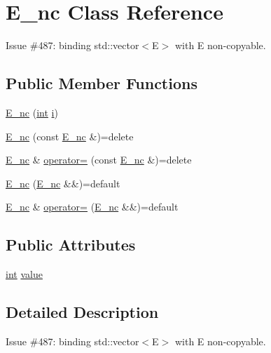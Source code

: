 \hypertarget{class_e__nc}{}\section{E\+\_\+nc Class Reference}
\label{class_e__nc}


Issue \#487\+: binding std\+::vector$<$\+E$>$ with E non-\/copyable.  


\subsection*{Public Member Functions}
\begin{DoxyCompactItemize}
\item 
\mbox{\hyperlink{class_e__nc_adacd8dd96177d755c54db09108e381ff}{E\+\_\+nc}} (\mbox{\hyperlink{warnings_8h_a74f207b5aa4ba51c3a2ad59b219a423b}{int}} \mbox{\hyperlink{abstract_8h_a13235ab5ddf5c2ccd5ca35ab01d91328}{i}})
\item 
\mbox{\hyperlink{class_e__nc_a42e51ed614a7af4fd2d0f6d71a077fab}{E\+\_\+nc}} (const \mbox{\hyperlink{class_e__nc}{E\+\_\+nc}} \&)=delete
\item 
\mbox{\hyperlink{class_e__nc}{E\+\_\+nc}} \& \mbox{\hyperlink{class_e__nc_aa03284dc9f6a270b67d05cbdf685326d}{operator=}} (const \mbox{\hyperlink{class_e__nc}{E\+\_\+nc}} \&)=delete
\item 
\mbox{\hyperlink{class_e__nc_acec3382251095c3b96ad1bd4c9d12179}{E\+\_\+nc}} (\mbox{\hyperlink{class_e__nc}{E\+\_\+nc}} \&\&)=default
\item 
\mbox{\hyperlink{class_e__nc}{E\+\_\+nc}} \& \mbox{\hyperlink{class_e__nc_a0425e50093013a3602f4e273d34f044f}{operator=}} (\mbox{\hyperlink{class_e__nc}{E\+\_\+nc}} \&\&)=default
\end{DoxyCompactItemize}
\subsection*{Public Attributes}
\begin{DoxyCompactItemize}
\item 
\mbox{\hyperlink{warnings_8h_a74f207b5aa4ba51c3a2ad59b219a423b}{int}} \mbox{\hyperlink{class_e__nc_a256331222685f023760f3604f0a41454}{value}}
\end{DoxyCompactItemize}


\subsection{Detailed Description}
Issue \#487\+: binding std\+::vector$<$\+E$>$ with E non-\/copyable. 

